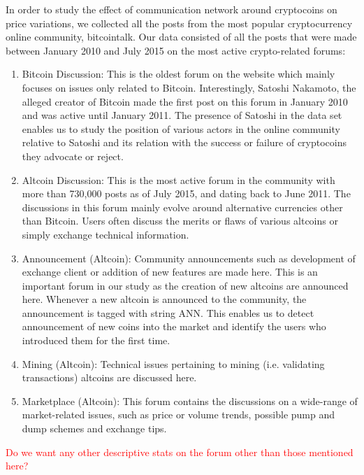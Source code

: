 In order to study the effect of communication network around cryptocoins on
price variations, we collected all the posts from the most popular cryptocurrency
online community, bitcointalk.  Our data consisted of all the posts that were
made between January 2010 and July 2015 on the most active crypto-related forums:
\begin{enumerate}
  \item{Bitcoin Discussion:} This is the oldest forum on the website which mainly focuses
    on issues only related to Bitcoin. Interestingly, Satoshi Nakamoto, the alleged
    creator of Bitcoin made the first post on this forum in January 2010 and
    was active until January 2011. The presence of Satoshi in the data set enables us
    to study the position of various actors in the online community relative to Satoshi
    and its relation with the success or failure of cryptocoins they advocate or reject.

  \item{Altcoin Discussion:} This is the most active forum in the community
    with more than 730,000 posts as of July 2015, and dating back to June 2011.
    The discussions in this forum mainly evolve around alternative currencies
    other than Bitcoin. Users often discuss the merits or flaws of various
    altcoins or simply exchange technical information.
  
  \item{Announcement (Altcoin):} Community announcements such as development of 
    exchange client or addition of new features are made here. This is an important forum
    in our study as the creation of new altcoins are announced here. Whenever a new
    altcoin is announced to the community, the announcement is tagged with string ANN.
    This enables us to detect announcement of new coins into the market and identify
    the users who introduced them for the first time.

  \item{Mining (Altcoin):} Technical issues pertaining to mining (i.e. validating transactions)
    altcoins are discussed here.
  \item{Marketplace (Altcoin):} This forum contains the discussions on a wide-range of 
    market-related issues, such as price or volume trends, possible pump and dump schemes
    and exchange tips.

\end{enumerate}
\textcolor{red}{Do we want any other descriptive stats on the forum other than those mentioned here?}


